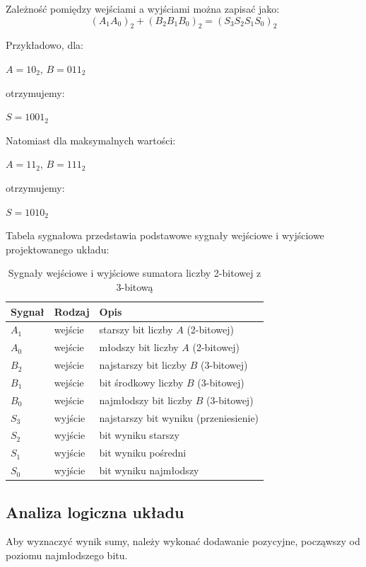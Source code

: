 \documentclass[11pt]{article}
\begin{document}
Zależność pomiędzy wejściami a wyjściami można zapisać jako:
\begin{equation}
(A_1 A_0)_2 + (B_2 B_1 B_0)_2 = (S_3 S_2 S_1 S_0)_2
\end{equation}

Przykładowo, dla:
\begin{center}
$A = 10_2$, $B = 011_2$
\end{center}
otrzymujemy:
\begin{center}
$S = 1001_2$
\end{center}

Natomiast dla maksymalnych wartości:
\begin{center}
$A = 11_2$, $B = 111_2$
\end{center}
otrzymujemy:
\begin{center}
$S = 1010_2$
\end{center}

Tabela sygnałowa przedstawia podstawowe sygnały wejściowe i wyjściowe projektowanego układu:
\begin{table}[H]
\centering
\caption{Sygnały wejściowe i wyjściowe sumatora liczby 2-bitowej z 3-bitową}
\label{tab:sygnaly}
\begin{tabular}{lll}
\toprule
Sygnał & Rodzaj & Opis \\
\midrule
\(A_1\) & wejście & starszy bit liczby \(A\) (2-bitowej) \\
\(A_0\) & wejście & młodszy bit liczby \(A\) (2-bitowej) \\
\(B_2\) & wejście & najstarszy bit liczby \(B\) (3-bitowej) \\
\(B_1\) & wejście & bit środkowy liczby \(B\) (3-bitowej) \\
\(B_0\) & wejście & najmłodszy bit liczby \(B\) (3-bitowej) \\
\(S_3\) & wyjście & najstarszy bit wyniku (przeniesienie) \\
\(S_2\) & wyjście & bit wyniku starszy \\
\(S_1\) & wyjście & bit wyniku pośredni \\
\(S_0\) & wyjście & bit wyniku najmłodszy \\
\bottomrule
\end{tabular}
\end{table}

\subsection{Analiza logiczna układu}

Aby wyznaczyć wynik sumy, należy wykonać dodawanie pozycyjne, począwszy od poziomu najmłodszego bitu.
\end{document}
